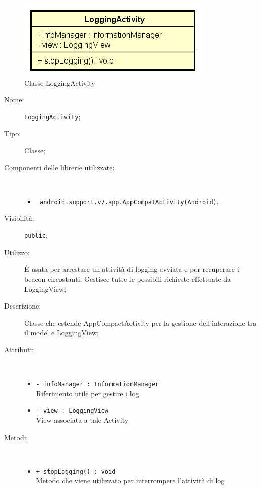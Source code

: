 \documentclass[../DefinizioneDiProdotto.tex]{subfiles}
\begin{document}
    \begin{figure}[H]
        \centering
        \includegraphics{img/LoggingActivity.png}
        \caption{Classe LoggingActivity}\label{fig:presenter::LoggingActivity} 
    \end{figure}
    \begin{description}
\item[Nome:] \texttt{LoggingActivity};
\item[Tipo:] Classe;
\item[Componenti delle librerie utilizzate:] \
\begin{itemize}
\item \texttt{ android.support.v7.app.AppCompatActivity(Android)}.

\end{itemize}
\item[Visibilità:] \texttt{public};
\item[Utilizzo:] È usata per arrestare un'attività di logging avviata e per recuperare i beacon circostanti. Gestisce tutte le possibili richieste effettuate da LoggingView;
\item[Descrizione:] Classe che estende AppCompactActivity per la gestione dell'interazione tra il model e LoggingView;
\item[Attributi:] \
\begin{itemize}
\item \texttt{- infoManager : InformationManager}\\
Riferimento utile per gestire i log

\item \texttt{- view : LoggingView}\\
View associata a tale Activity

\end{itemize}
\item[Metodi:] \
\begin{itemize}
\item \texttt{+ stopLogging() : void}\\
Metodo che viene utilizzato per interrompere l'attività di log
 \end{itemize}
\end{description}
\end{document}
